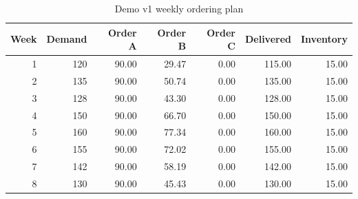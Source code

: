 \begin{table}[H]
\centering
\caption{Demo v1 weekly ordering plan}
\label{tab:demo-v1-order-plan}
\begin{tabular}{rrrrrrr}
\toprule
Week & Demand & Order A & Order B & Order C & Delivered & Inventory \\
\midrule
1 & 120 & 90.00 & 29.47 & 0.00 & 115.00 & 15.00 \\
2 & 135 & 90.00 & 50.74 & 0.00 & 135.00 & 15.00 \\
3 & 128 & 90.00 & 43.30 & 0.00 & 128.00 & 15.00 \\
4 & 150 & 90.00 & 66.70 & 0.00 & 150.00 & 15.00 \\
5 & 160 & 90.00 & 77.34 & 0.00 & 160.00 & 15.00 \\
6 & 155 & 90.00 & 72.02 & 0.00 & 155.00 & 15.00 \\
7 & 142 & 90.00 & 58.19 & 0.00 & 142.00 & 15.00 \\
8 & 130 & 90.00 & 45.43 & 0.00 & 130.00 & 15.00 \\
\bottomrule
\end{tabular}
\end{table}
